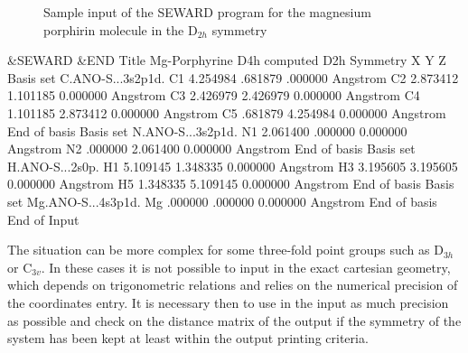 
\begin{figure}[ht]
\caption{Sample input of the SEWARD program for the magnesium 
porphirin molecule in the D$_{2h}$ symmetry}
\label{fig:porph}
\end{figure}
\begin{inputlisting}
 &SEWARD &END                                                                   
Title                                                                           
 Mg-Porphyrine D4h computed D2h
Symmetry                                                                        
 X Y Z                                                                          
Basis set                                                                       
C.ANO-S...3s2p1d.                                                                  
C1    4.254984     .681879     .000000  Angstrom
C2    2.873412    1.101185    0.000000  Angstrom
C3    2.426979    2.426979    0.000000  Angstrom
C4    1.101185    2.873412    0.000000  Angstrom
C5     .681879    4.254984    0.000000  Angstrom
End of basis                                                                    
Basis set                                                                       
N.ANO-S...3s2p1d.                                                                  
N1    2.061400     .000000    0.000000  Angstrom
N2     .000000    2.061400    0.000000  Angstrom
End of basis                                                                    
Basis set                                                                       
H.ANO-S...2s0p.                                                                   
H1    5.109145    1.348335    0.000000  Angstrom
H3    3.195605    3.195605    0.000000  Angstrom
H5    1.348335    5.109145    0.000000  Angstrom
End of basis                                                                    
Basis set                                                                       
Mg.ANO-S...4s3p1d.                                                                  
Mg     .000000     .000000    0.000000  Angstrom
End of basis                                                                    
End of Input                                                                    
\end{inputlisting}


The situation can be more complex for some three-fold point groups
such as D$_{3h}$ or C$_{3v}$. In these cases it is not possible
to input in the exact cartesian geometry, which depends on 
trigonometric relations and relies on the numerical precision
of the coordinates entry. It is necessary then to use in the 
 input as much
precision as possible and check on the distance matrix of the
 output if the symmetry of the system has been
kept at least within the output printing criteria.
